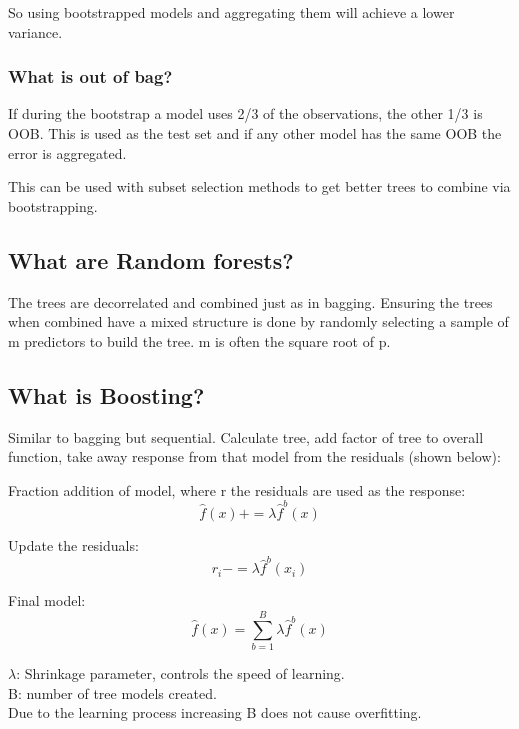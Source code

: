 \documentclass[11pt]{scrartcl} %
\begin{document}
So using bootstrapped models and aggregating them will achieve a lower variance.

\subsubsection{What is out of bag?}

If during the bootstrap a model uses 2/3 of the observations, the other 1/3 is OOB. This is used
as the test set and if any other model has the same OOB the error is aggregated.

This can be used with subset selection methods to get better trees to combine via bootstrapping.

\subsection{What are Random forests?}

The trees are decorrelated and combined just as in bagging. Ensuring the trees when combined have a
mixed structure is done by randomly selecting a sample of m predictors to build the tree. m is often
the square root of p.

\subsection{What is Boosting?}

Similar to bagging but sequential. Calculate tree, add factor of tree to overall function, take away
response from that model from the residuals (shown below):

Fraction addition of model, where r the residuals are used as the response:
\begin{equation}
	\hat{f}(x) += \lambda \hat{f}^b(x)
\end{equation}

Update the residuals:
\begin{equation}
	r_i -= \lambda \hat{f}^b(x_i)
\end{equation}

Final model:
\begin{equation}
	\hat{f}(x) = \sum^B_{b=1}{\lambda\hat{f}^b(x)}
\end{equation}

\(\lambda\): Shrinkage parameter, controls the speed of learning.\\
B: number of tree models created.\\

Due to the learning process increasing B does not cause overfitting.
\end{document}
